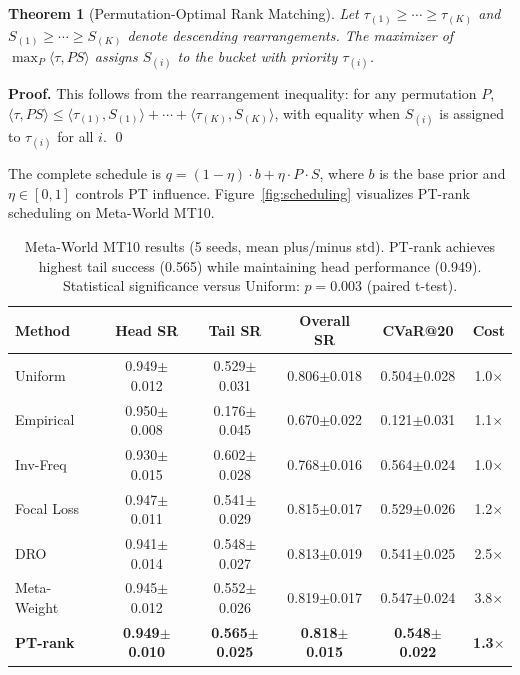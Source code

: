 \documentclass[twocolumn, a4paper, 11pt]{article}
\newtheorem{theorem}{Theorem}
\newenvironment{Proof}{\par\noindent\textbf{Proof.}}{\qed\par}
\begin{document}
\begin{theorem}[Permutation-Optimal Rank Matching]
Let $\tau_{(1)}\geq\cdots\geq\tau_{(K)}$ and $S_{(1)}\geq\cdots\geq S_{(K)}$ denote descending rearrangements. The maximizer of $\max_P\langle\tau,PS\rangle$ assigns $S_{(i)}$ to the bucket with priority $\tau_{(i)}$.
\label{th:rank}
\end{theorem}

\begin{Proof}
This follows from the rearrangement inequality: for any permutation $P$, $\langle\tau,PS\rangle\leq\langle\tau_{(1)},S_{(1)}\rangle+\cdots+\langle\tau_{(K)},S_{(K)}\rangle$, with equality when $S_{(i)}$ is assigned to $\tau_{(i)}$ for all $i$.
\end{Proof}

The complete schedule is $q=(1-\eta)\cdot b+\eta\cdot P\cdot S$, where $b$ is the base prior and $\eta\in[0,1]$ controls PT influence. Figure~\ref{fig:scheduling} visualizes PT-rank scheduling on Meta-World MT10.

\begin{table}[t]
\caption{Meta-World MT10 results (5 seeds, mean plus/minus std). PT-rank achieves highest tail success (0.565) while maintaining head performance (0.949). Statistical significance versus Uniform: $p=0.003$ (paired t-test).}
\label{tab:mt10}
\centering
\begin{tabular}{lccccc}
\toprule
Method & Head SR & Tail SR & Overall SR & CVaR@20 & Cost\\
\midrule
Uniform & 0.949$\pm$0.012 & 0.529$\pm$0.031 & 0.806$\pm$0.018 & 0.504$\pm$0.028 & 1.0$\times$ \\
Empirical & 0.950$\pm$0.008 & 0.176$\pm$0.045 & 0.670$\pm$0.022 & 0.121$\pm$0.031 & 1.1$\times$ \\
Inv-Freq & 0.930$\pm$0.015 & 0.602$\pm$0.028 & 0.768$\pm$0.016 & 0.564$\pm$0.024 & 1.0$\times$ \\
Focal Loss~\cite{lin2017focal} & 0.947$\pm$0.011 & 0.541$\pm$0.029 & 0.815$\pm$0.017 & 0.529$\pm$0.026 & 1.2$\times$ \\
DRO~\cite{sinha2018certifiable} & 0.941$\pm$0.014 & 0.548$\pm$0.027 & 0.813$\pm$0.019 & 0.541$\pm$0.025 & 2.5$\times$ \\
Meta-Weight~\cite{shu2019metaweight} & 0.945$\pm$0.012 & 0.552$\pm$0.026 & 0.819$\pm$0.017 & 0.547$\pm$0.024 & 3.8$\times$ \\
\textbf{PT-rank} & \textbf{0.949$\pm$0.010} & \textbf{0.565$\pm$0.025} & \textbf{0.818$\pm$0.015} & \textbf{0.548$\pm$0.022} & \textbf{1.3$\times$} \\
\bottomrule
\end{tabular}
\end{table}
\end{document}

